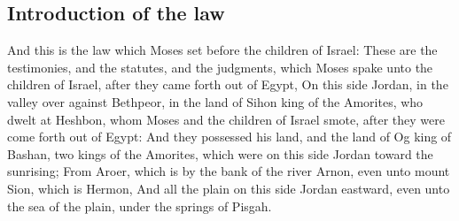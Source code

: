 \begin{biblechapter}
\section*{Introduction of the law}
\verse And this is the law which Moses set before the children of Israel:
\verse These are the testimonies, and the statutes, and the judgments, which Moses spake unto the children of Israel, after they came forth out of Egypt,
\verse On this side Jordan, in the valley over against Bethpeor, in the land of Sihon king of the Amorites, who dwelt at Heshbon, whom Moses and the children of Israel smote, after they were come forth out of Egypt:
\verse And they possessed his land, and the land of Og king of Bashan, two kings of the Amorites, which were on this side Jordan toward the sunrising;
\verse From Aroer, which is by the bank of the river Arnon, even unto mount Sion, which is Hermon,
\verse And all the plain on this side Jordan eastward, even unto the sea of the plain, under the springs of Pisgah.
\end{biblechapter}


